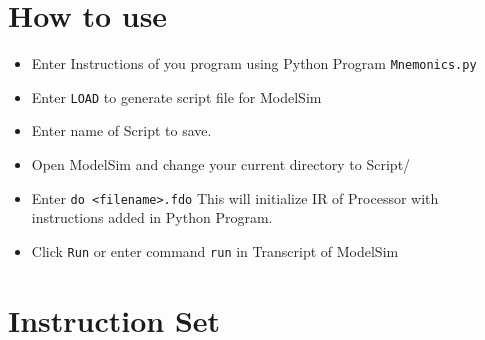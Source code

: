 \documentclass[a4paper,12pt]{article}
\begin{document}
\section{How to use}
\begin{itemize}
\item Enter Instructions of you program using Python Program \texttt{Mnemonics.py}
\item Enter \texttt{LOAD} to generate script file for ModelSim
\item Enter name of Script to save.
\item Open ModelSim and change your current directory to Script/
\item Enter \texttt{do <filename>.fdo}
This will initialize IR of Processor with instructions added in Python Program.
\item Click \texttt{Run} or enter command \texttt{run} in Transcript of ModelSim
\end{itemize}

\section{Instruction Set}
\end{document}
